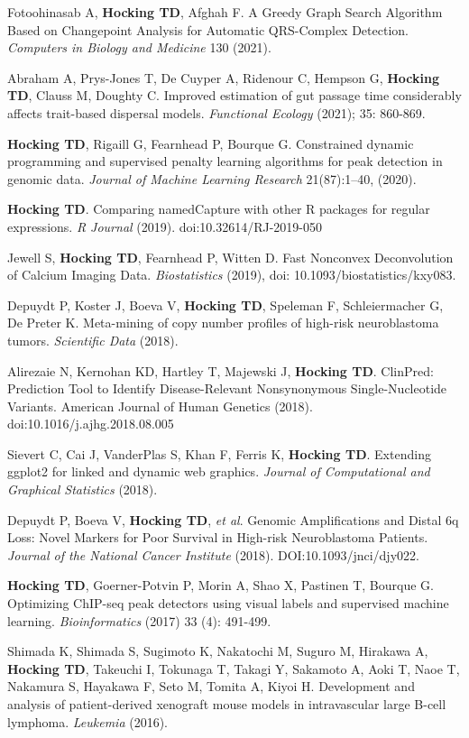 \documentclass[margin,line]{res}
\begin{document}
\begin{resume}
Fotoohinasab A, {\bf Hocking TD}, Afghah F. A Greedy Graph Search
Algorithm Based on Changepoint Analysis for Automatic QRS-Complex
Detection. {\it Computers in Biology and Medicine} 130 (2021).

Abraham A, Prys-Jones T, De Cuyper A, Ridenour C, Hempson G, {\bf
  Hocking TD}, Clauss M, Doughty C. Improved estimation of gut passage
time considerably affects trait-based dispersal models. {\it
  Functional Ecology} (2021); 35: 860-869.

{\bf Hocking TD}, Rigaill G, Fearnhead P, Bourque G. Constrained
dynamic programming and supervised penalty learning algorithms for
peak detection in genomic data. {\it Journal of Machine Learning
  Research} 21(87):1--40, (2020).

{\bf Hocking TD}. Comparing namedCapture with other R packages for
regular expressions. {\it R Journal} (2019). doi:10.32614/RJ-2019-050

Jewell S, {\bf Hocking TD}, Fearnhead P, Witten D. Fast Nonconvex
Deconvolution of Calcium Imaging Data. {\it Biostatistics} (2019), doi:
10.1093/biostatistics/kxy083.

Depuydt P, Koster J, Boeva V, {\bf Hocking TD}, Speleman F,
Schleiermacher G, De Preter K. Meta-mining of copy number profiles of
high-risk neuroblastoma tumors. {\it Scientific Data} (2018).

Alirezaie N, Kernohan KD, Hartley T, Majewski J, {\bf Hocking
  TD}. ClinPred: Prediction Tool to Identify Disease-Relevant
Nonsynonymous Single-Nucleotide Variants. American Journal of Human
Genetics (2018). doi:10.1016/j.ajhg.2018.08.005

Sievert C, Cai J, VanderPlas S, Khan F, Ferris K, {\bf Hocking
  TD}. Extending ggplot2 for linked and dynamic web graphics. {\it
  Journal of Computational and Graphical Statistics} (2018).

Depuydt P, Boeva V, {\bf Hocking TD}, {\it et al}. Genomic
Amplifications and Distal 6q Loss: Novel Markers for Poor Survival in
High-risk Neuroblastoma Patients. {\it Journal of the National Cancer
  Institute} (2018). DOI:10.1093/jnci/djy022.

{\bf Hocking TD}, Goerner-Potvin P, Morin A, Shao X, Pastinen T,
Bourque G. Optimizing ChIP-seq peak detectors using visual labels and
supervised machine learning. {\it Bioinformatics} (2017) 33 (4): 491-499.

Shimada K, Shimada S, Sugimoto K, Nakatochi M, Suguro M, Hirakawa A,
{\bf Hocking TD}, Takeuchi I, Tokunaga T, Takagi Y, Sakamoto A, Aoki T, Naoe
T, Nakamura S, Hayakawa F, Seto M, Tomita A, Kiyoi H. Development and
analysis of patient-derived xenograft mouse models in intravascular
large B-cell lymphoma. {\it Leukemia} (2016).


\end{resume}
\end{document}
